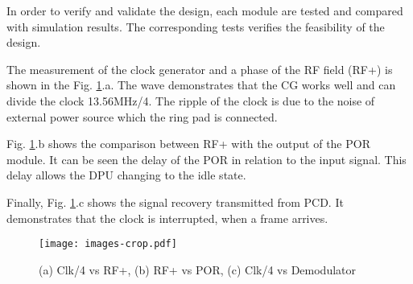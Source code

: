 In order to verify and validate the design, each module are tested and compared with simulation results. The corresponding tests verifies the feasibility of the design.

The measurement of the clock generator and a phase of the RF field (RF+) is shown in the Fig. \ref{fig:meas}.a. The wave demonstrates that the CG works well and can divide the clock 13.56MHz/4. The ripple of the clock is due to the noise of external power source which the ring pad is connected. 

Fig. \ref{fig:meas}.b shows the comparison between RF+ with the output of the POR module. It can be seen the delay of the POR in relation to the input signal. This delay allows the DPU changing to the idle state.

Finally, Fig. \ref{fig:meas}.c shows the signal recovery transmitted from PCD. It demonstrates that the clock is interrupted, when a frame arrives.

\begin{figure}[h]
  \centering
  \texttt{[image: images-crop.pdf]}
  \caption{(a) Clk/4 vs RF+, (b) RF+ vs POR, (c) Clk/4 vs Demodulator}
  \label{fig:meas}
\end{figure}